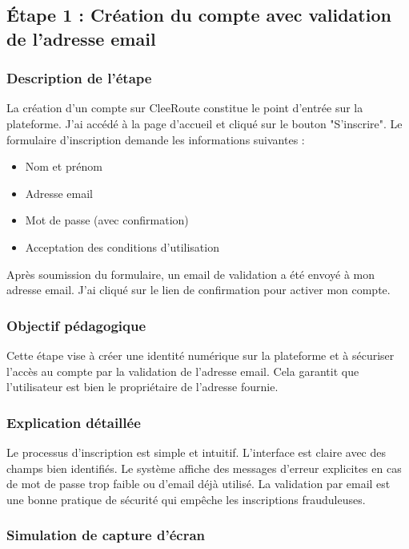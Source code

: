 \documentclass[12pt,a4paper]{article}
\begin{document}
\subsection{Étape 1 : Création du compte avec validation de l'adresse email}

\subsubsection{Description de l'étape}

La création d'un compte sur CleeRoute constitue le point d'entrée sur la plateforme. J'ai accédé à la page d'accueil et cliqué sur le bouton "S'inscrire". Le formulaire d'inscription demande les informations suivantes :
\begin{itemize}
    \item Nom et prénom
    \item Adresse email
    \item Mot de passe (avec confirmation)
    \item Acceptation des conditions d'utilisation
\end{itemize}

Après soumission du formulaire, un email de validation a été envoyé à mon adresse email. J'ai cliqué sur le lien de confirmation pour activer mon compte.

\subsubsection{Objectif pédagogique}

Cette étape vise à créer une identité numérique sur la plateforme et à sécuriser l'accès au compte par la validation de l'adresse email. Cela garantit que l'utilisateur est bien le propriétaire de l'adresse fournie.

\subsubsection{Explication détaillée}

Le processus d'inscription est simple et intuitif. L'interface est claire avec des champs bien identifiés. Le système affiche des messages d'erreur explicites en cas de mot de passe trop faible ou d'email déjà utilisé. La validation par email est une bonne pratique de sécurité qui empêche les inscriptions frauduleuses.

\subsubsection{Simulation de capture d'écran}
\end{document}
